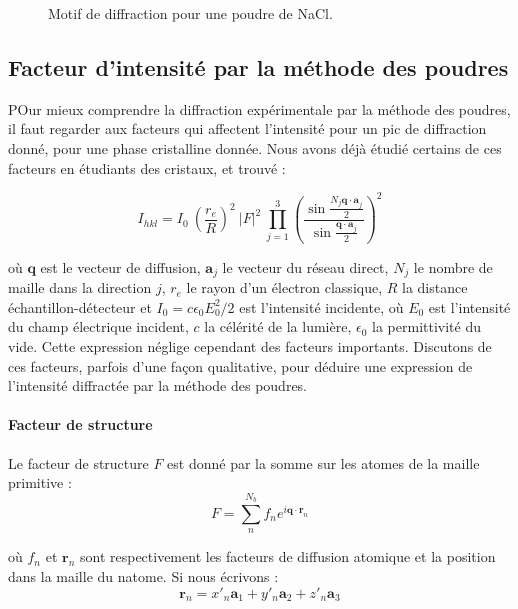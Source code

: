 \begin{figure}
    \TODO
    \caption{Motif de diffraction pour une poudre de NaCl.}
    \label{fig:poudrepic}
\end{figure}


\subsection{Facteur d'intensité par la méthode des poudres}

POur mieux comprendre la diffraction expérimentale par la méthode des poudres, il faut regarder aux facteurs qui affectent l'intensité pour un pic de diffraction donné, pour une phase cristalline donnée. Nous avons déjà étudié certains de ces facteurs en étudiants des cristaux, et trouvé :

\begin{equation}
    I_{hkl} = I_0 \ 
        \left( \frac{r_e}{R} \right)^2 \ 
        |F|^2 \ 
        \prod_{j=1}^3 \left(
            \frac{ \sin \frac{N_j \mathbf{q \cdot a}_j}{2} }{ \sin \frac{\mathbf{q\cdot a}_j}{2} } \right)^2
\end{equation}

où $\mathbf{q}$ est le vecteur de diffusion, $\mathbf{a}_j$ le vecteur du réseau direct, $N_j$ le nombre de maille dans la direction $j$, $r_e$ le rayon d'un électron classique, $R$ la distance échantillon-détecteur et $I_0 = c\epsilon_0 E_0^2/2$ est l'intensité incidente, où $E_0$ est l'intensité du champ électrique incident, $c$ la célérité de la lumière, $\epsilon_0$ la permittivité du vide. Cette expression néglige cependant des facteurs importants. Discutons de ces facteurs, parfois d'une façon qualitative, pour déduire une expression de l'intensité diffractée par la méthode des poudres.

\paragraph{Facteur de structure}

Le facteur de structure $F$ est donné par la somme sur les atomes de la maille primitive :
\begin{equation}
    F = \sum_n^{N_b} f_n e^{i\mathbf{q\cdot r}_n}
\end{equation}

où $f_n$ et $\mathbf{r}_n$ sont respectivement les facteurs de diffusion atomique et la position dans la maille du n\ieme atome. Si nous écrivons :
\begin{equation}
    \mathbf{r}_n = x'_n \mathbf{a}_1 + y'_n \mathbf{a}_2 + z'_n \mathbf{a}_3
\end{equation}

